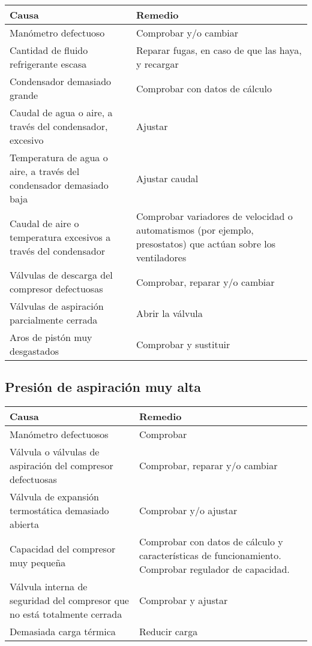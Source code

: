 \begin{table}[H]
    \begin{center}
        \begin{tabular}{p{8cm} p{7cm}}
            \textbf{Causa} & \textbf{Remedio}\\ \hline
            Man\'ometro defectuoso & Comprobar y/o cambiar\\
            Cantidad de fluido refrigerante escasa & Reparar fugas, en caso de que las haya, y recargar\\
            Condensador demasiado grande & Comprobar con datos de c\'alculo\\
            Caudal de agua o aire, a trav\'es del condensador, excesivo & Ajustar\\
            Temperatura de agua o aire, a trav\'es del condensador demasiado baja & Ajustar caudal\\
            Caudal de aire o temperatura excesivos a trav\'es del condensador & Comprobar variadores de velocidad o automatismos (por ejemplo, presostatos) que act\'uan sobre los ventiladores\\
            V\'alvulas de descarga del compresor defectuosas & Comprobar, reparar y/o cambiar\\
            V\'alvulas de aspiraci\'on parcialmente cerrada & Abrir la v\'alvula\\
            Aros de pist\'on muy desgastados & Comprobar y sustituir\\ \hline
        \end{tabular}
    \end{center}
\end{table}

\subsection{Presi\'on de aspiraci\'on muy alta}

\begin{table}[H]
    \begin{center}
        \begin{tabular}{p{8cm} p{7cm}}
            \textbf{Causa} & \textbf{Remedio}\\ \hline
            Man\'ometro defectuosos & Comprobar\\
            V\'alvula o v\'alvulas de aspiraci\'on del compresor defectuosas & Comprobar, reparar y/o cambiar\\
            V\'alvula de expansi\'on termost\'atica demasiado abierta & Comprobar y/o ajustar\\
            Capacidad del compresor muy pequeña & Comprobar con datos de c\'alculo y caracter\'isticas de funcionamiento. Comprobar regulador de capacidad.\\
            V\'alvula interna de seguridad del compresor que no est\'a totalmente cerrada & Comprobar y ajustar\\
            Demasiada carga t\'ermica & Reducir carga\\ \hline
        \end{tabular}
    \end{center}
\end{table}

